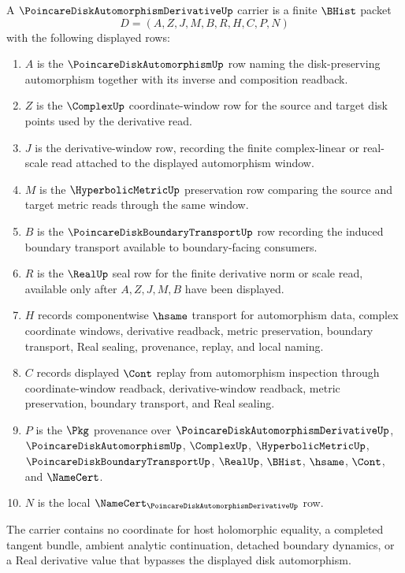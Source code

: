 \begin{definition}
\label{def:poincare-disk-automorphism-derivative-carrier}
A $\PoincareDiskAutomorphismDerivativeUp$ carrier is a finite $\BHist$ packet
$$
D=(A,Z,J,M,B,R,H,C,P,N)
$$
with the following displayed rows:
\begin{enumerate}
\item $A$ is the $\PoincareDiskAutomorphismUp$ row naming the disk-preserving automorphism together with its inverse and composition readback.
\item $Z$ is the $\ComplexUp$ coordinate-window row for the source and target disk points used by the derivative read.
\item $J$ is the derivative-window row, recording the finite complex-linear or real-scale read attached to the displayed automorphism window.
\item $M$ is the $\HyperbolicMetricUp$ preservation row comparing the source and target metric reads through the same window.
\item $B$ is the $\PoincareDiskBoundaryTransportUp$ row recording the induced boundary transport available to boundary-facing consumers.
\item $R$ is the $\RealUp$ seal row for the finite derivative norm or scale read, available only after $A,Z,J,M,B$ have been displayed.
\item $H$ records componentwise $\hsame$ transport for automorphism data, complex coordinate windows, derivative readback, metric preservation, boundary transport, Real sealing, provenance, replay, and local naming.
\item $C$ records displayed $\Cont$ replay from automorphism inspection through coordinate-window readback, derivative-window readback, metric preservation, boundary transport, and Real sealing.
\item $P$ is the $\Pkg$ provenance over $\PoincareDiskAutomorphismDerivativeUp$, $\PoincareDiskAutomorphismUp$, $\ComplexUp$, $\HyperbolicMetricUp$, $\PoincareDiskBoundaryTransportUp$, $\RealUp$, $\BHist$, $\hsame$, $\Cont$, and $\NameCert$.
\item $N$ is the local $\NameCert_{\PoincareDiskAutomorphismDerivativeUp}$ row.
\end{enumerate}
The carrier contains no coordinate for host holomorphic equality, a completed tangent bundle, ambient analytic continuation, detached boundary dynamics, or a Real derivative value that bypasses the displayed disk automorphism.
\end{definition}


